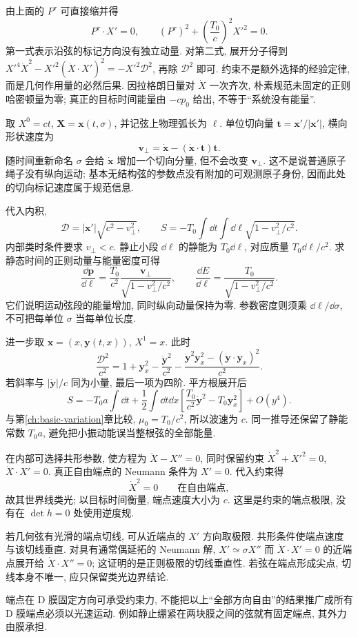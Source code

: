由上面的 $P^\tau$ 可直接缩并得
\[
 P^\tau\cdot X'=0,\qquad
 (P^\tau)^2+\left(\frac{T_0}{c}\right)^2X'^2=0.
\]
第一式表示沿弦的标记方向没有独立动量. 对第二式, 展开分子得到
$X'^4\dot X^2-X'^2(\dot X\cdot X')^2=-X'^2\mathcal D^2$, 再除 $\mathcal D^2$ 即可. 约束不是额外选择的经验定律, 而是几何作用量的必然后果. 因拉格朗日量对 $\dot X$ 一次齐次, 朴素规范未固定的正则哈密顿量为零; 真正的目标时间能量由 $-cp_0$ 给出, 不等于“系统没有能量”.

取 $X^0=ct$, $\boldsymbol X=\boldsymbol x(t,\sigma)$, 并记弦上物理弧长为 $\ell$. 单位切向量 $\boldsymbol t=\boldsymbol x'/|\boldsymbol x'|$, 横向形状速度为
\[
 \boldsymbol v_\perp=\dot{\boldsymbol x}
 -(\dot{\boldsymbol x}\cdot\boldsymbol t)\boldsymbol t.
\]
随时间重新命名 $\sigma$ 会给 $\dot{\boldsymbol x}$ 增加一个切向分量, 但不会改变 $\boldsymbol v_\perp$. 这不是说普通原子绳子没有纵向运动; 基本无结构弦的参数点没有附加的可观测原子身份, 因而此处的切向标记速度属于规范信息.

代入内积,
\[
 \mathcal D=|\boldsymbol x'|\sqrt{c^2-v_\perp^2},\qquad
 S=-T_0\int\dd t\int\dd\ell\sqrt{1-v_\perp^2/c^2}.
\]
内部类时条件要求 $v_\perp<c$. 静止小段 $\dd\ell$ 的静能为 $T_0\dd\ell$, 对应质量 $T_0\dd\ell/c^2$. 求静态时间的正则动量与能量密度可得
\[
 \frac{\dd\boldsymbol p}{\dd\ell}
 =\frac{T_0}{c^2}\frac{\boldsymbol v_\perp}{\sqrt{1-v_\perp^2/c^2}},
 \qquad\frac{\dd E}{\dd\ell}
 =\frac{T_0}{\sqrt{1-v_\perp^2/c^2}}.
\]
它们说明运动弦段的能量增加, 同时纵向动量保持为零. 参数密度则须乘 $\dd\ell/\dd\sigma$, 不可把每单位 $\sigma$ 当每单位长度.

进一步取 $\boldsymbol x=(x,\boldsymbol y(t,x))$, $X^1=x$. 此时
\[
 \frac{\mathcal D^2}{c^2}
 =1+\boldsymbol y_x^2-\frac{\dot{\boldsymbol y}^2}{c^2}
 -\frac{\dot{\boldsymbol y}^2\boldsymbol y_x^2
 -(\dot{\boldsymbol y}\cdot\boldsymbol y_x)^2}{c^2}.
\]
若斜率与 $|\dot{\boldsymbol y}|/c$ 同为小量, 最后一项为四阶. 平方根展开后
\[
 S=-T_0a\int\dd t+
 \frac12\int\dd t\dd x\left[
 \frac{T_0}{c^2}\dot{\boldsymbol y}^2-T_0\boldsymbol y_x^2\right]+O(y^4).
\]
与第\ref{ch:basic-variation}章比较, $\mu_0=T_0/c^2$, 所以波速为 $c$. 同一推导还保留了静能常数 $T_0a$, 避免把小振动能误当整根弦的全部能量.

在内部可选择共形参数, 使方程为 $\ddot X-X''=0$, 同时保留约束 $\dot X^2+X'^2=0$, $\dot X\cdot X'=0$. 真正自由端点的 Neumann 条件为 $X'=0$. 代入约束得
\[
 \dot X^2=0\qquad\text{在自由端点},
\]
故其世界线类光; 以目标时间衡量, 端点速度大小为 $c$. 这里是约束的端点极限, 没有在 $\det h=0$ 处使用逆度规.

若几何弦有光滑的端点切线, 可从近端点的 $X'$ 方向取极限. 共形条件使端点速度与该切线垂直. 对具有通常偶延拓的 Neumann 解, $X'\simeq\sigma X''$ 而 $\dot X\cdot X'=0$ 的近端点展开给 $\dot X\cdot X''=0$; 这证明的是正则极限的切线垂直性. 若弦在端点形成尖点, 切线本身不唯一, 应只保留类光边界结论.

端点在 D 膜固定方向可承受约束力, 不能把以上“全部方向自由”的结果推广成所有 D 膜端点必须以光速运动. 例如静止绷紧在两块膜之间的弦就有固定端点, 其外力由膜承担.
